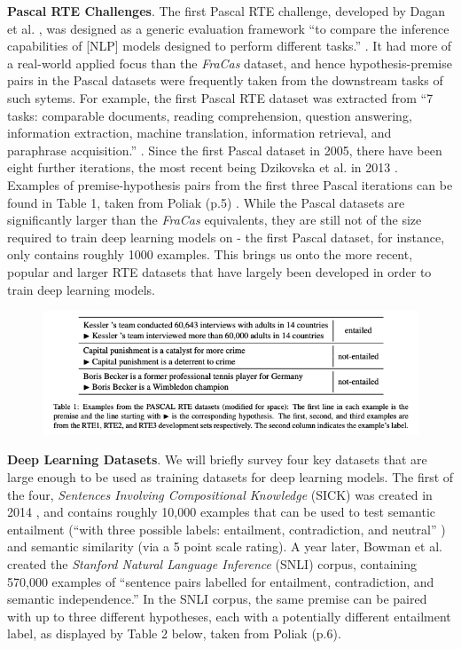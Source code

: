 \documentclass[12pt,twoside]{report}
\begin{document}
\textbf{Pascal RTE Challenges}. The first Pascal RTE challenge, developed by Dagan et al. \cite{dagan2005}, was designed as a generic evaluation framework ``to compare the inference capabilities of [NLP] models designed to perform different tasks.'' \cite{poliak-2020-survey}. It had more of a real-world applied focus than the \textit{FraCas} dataset, and hence hypothesis-premise pairs in the Pascal datasets were frequently taken from the downstream tasks of such sytems. For example, the first Pascal RTE dataset was extracted from ``7 tasks: comparable documents, reading comprehension, question answering, information extraction, machine translation, information retrieval, and paraphrase acquisition.'' \cite{poliak-2020-survey}. Since the first Pascal dataset in 2005, there have been eight further iterations, the most recent being Dzikovska et al. in 2013 \cite{dzikovska-etal-2013-semeval}. Examples of premise-hypothesis pairs from the first three Pascal iterations can be found in Table 1, taken from Poliak (p.5) \cite{poliak-2020-survey}. While the Pascal datasets are significantly larger than the \textit{FraCas} equivalents, they are still not of the size required to train deep learning models on - the first Pascal dataset, for instance, only contains roughly 1000 examples. This brings us onto the more recent, popular and larger RTE datasets that have largely been developed in order to train deep learning models.

\begin{figure}[H]
\centering
\includegraphics[width = 1\hsize]{./figures/PASCAL examples.png}
\label{fig:PASCAL}
\end{figure}

\textbf{Deep Learning Datasets}. We will briefly survey four key datasets that are large enough to be used as training datasets for deep learning models. The first of the four, \textit{Sentences Involving Compositional Knowledge} (SICK) was created in 2014 \cite{marelli-etal-2014-sick}, and contains roughly 10,000 examples that can be used to test semantic entailment (``with three possible labels: entailment, contradiction, and neutral'' \cite{PARAMASIVAM20229644}) and semantic similarity (via a 5 point scale rating). A year later, Bowman et al. \cite{bowman2015} created the \textit{Stanford Natural Language Inference} (SNLI) corpus, containing 570,000 examples of ``sentence pairs labelled for entailment, contradiction, and semantic independence.'' \cite{PARAMASIVAM20229644} In the SNLI corpus, the same premise can be paired with up to three different hypotheses, each with a potentially different entailment label, as displayed by Table 2 below, taken from Poliak (p.6)\cite{poliak-2020-survey}.
\end{document}
